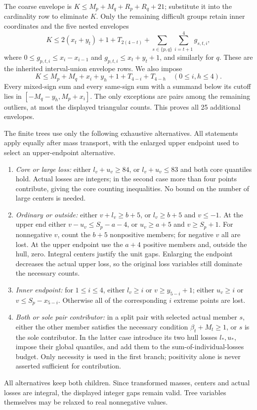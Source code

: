 \documentclass[11pt,a4paper]{article}
\begin{document}
The coarse envelope is $K\le M_p+M_q+R_p+R_q+21$; substitute it into
the cardinality row to eliminate $K$. Only the remaining difficult
groups retain inner coordinates and the five nested envelopes
\[
 K\le2(x_t+y_t)+1+T_{2(4-t)}+\sum_{s\in\{p,q\}}\sum_{i=t+1}^4g_{s,t,i},
\]
where $0\le g_{p,t,i}\le x_i-x_{i-1}$ and
$g_{p,t,i}\le x_t+y_t+1$, and similarly for $q$.
These are the inherited interval-union envelope rows. We also impose
\[
 K\le M_p+M_q+x_i+y_h+1+T_{4-i}+T_{4-h}\quad(0\le i,h\le4).
\]
Every mixed-sign sum and every same-sign sum with a summand below its
cutoff lies in $[-M_q-y_h,M_p+x_i]$. The only exceptions are pairs
among the remaining outliers, at most the displayed triangular counts.
This proves all 25 additional envelopes.

The finite trees use only the following exhaustive alternatives. All
statements apply equally after mass transport, with the enlarged upper
endpoint used to select an upper-endpoint alternative.
\begin{enumerate}
\item \emph{Core or large loss:} either $l_v+u_v\ge84$, or
$l_v+u_v\le83$ and both core quantiles hold. Actual losses are integers;
in the second case more than four points contribute, giving the core
counting inequalities. No bound on the number of large centers is needed.
\item \emph{Ordinary or outside:} either $v+l_v\ge b+5$, or
$l_v\ge b+5$ and $v\le-1$. At the upper end either
$v-u_v\le S_p-a-4$, or $u_v\ge a+5$ and $v\ge S_p+1$.
For nonnegative $v$, count the $b+5$ nonpositive members; for negative
$v$ all are lost. At the upper endpoint use the $a+4$ positive members
and, outside the hull, zero. Integral centers justify the unit gaps.
Enlarging the endpoint decreases the actual upper loss, so the original
loss variables still dominate the necessary counts.
\item \emph{Inner endpoint:} for $1\le i\le4$, either $l_v\ge i$ or
$v\ge y_{5-i}+1$; either $u_v\ge i$ or $v\le S_p-x_{5-i}$.
Otherwise all of the corresponding $i$ extreme points are lost.
\item \emph{Both or sole pair contributor:} in a split pair with selected
actual member $s$, either the other member satisfies the necessary
condition $\beta_t+M_t\ge1$, or $s$ is the sole contributor. In the
latter case introduce its two hull losses $l_*,u_*$, impose their global
quantiles, and add them to the sum-of-individual-losses budget.
Only necessity is used in the first branch; positivity alone is never
asserted sufficient for contribution.
\end{enumerate}
All alternatives keep both children. Since transformed masses, centers
and actual losses are integral, the displayed integer gaps remain valid.
Tree variables themselves may be relaxed to real nonnegative values.
\end{document}
